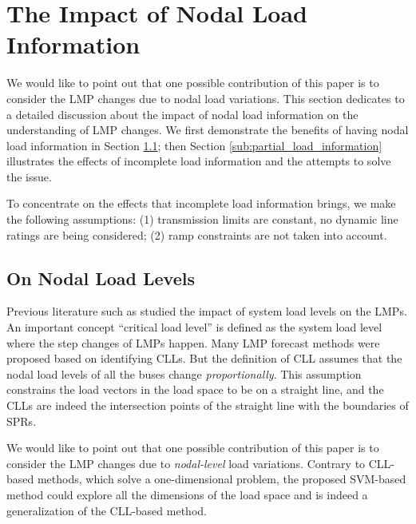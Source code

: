 \documentclass[letterpaper, 11pt]{article}
\theoremstyle{plain}
\theoremstyle{definition}
\begin{document}
\section{The Impact of Nodal Load Information} \label{sec:impact_of_nodal_load_information}
We would like to point out that one possible contribution of this paper is to consider the LMP changes due to nodal
load variations. This section dedicates to a detailed discussion about the impact of nodal load information on the understanding of LMP changes. We first demonstrate the benefits of having nodal load information in Section \ref{sub:how_the_nodal_load_levels_help_us_}; then Section \ref{sub:partial_load_information} illustrates the effects of incomplete load information and the attempts to solve the issue.

To concentrate on the effects that incomplete load information brings, we make the following assumptions: (1) transmission limits are constant, no dynamic line ratings are being considered; (2) ramp constraints are not taken into account.


\subsection{On Nodal Load Levels} \label{sub:how_the_nodal_load_levels_help_us_}
Previous literature such as \cite{Li2007} studied the impact of system load levels on the LMPs. An important concept ``critical load level'' is defined as the system load level where the step changes of LMPs happen. Many LMP forecast methods were proposed based on identifying CLLs. But the definition of CLL assumes that the nodal load levels of all the buses change \emph{proportionally}. This assumption constrains the load vectors in the load space to be on a straight line, and the CLLs are indeed the intersection points of the straight line with the boundaries of SPRs.


We would like to point out that one possible contribution of this paper is to consider the LMP changes due to \emph{nodal-level} load variations.
Contrary to CLL-based methods, which solve a one-dimensional problem, the proposed SVM-based method could explore all the dimensions of the load space and is indeed a generalization of the CLL-based method.
\end{document}

